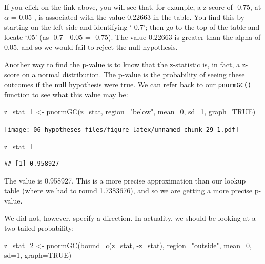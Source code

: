 \documentclass[
]{book}
\newenvironment{Shaded}{\begin{snugshade}}{\end{snugshade}}
\newcommand{\AttributeTok}[1]{\textcolor[rgb]{0.77,0.63,0.00}{#1}}
\newcommand{\ConstantTok}[1]{\textcolor[rgb]{0.00,0.00,0.00}{#1}}
\newcommand{\DecValTok}[1]{\textcolor[rgb]{0.00,0.00,0.81}{#1}}
\newcommand{\FunctionTok}[1]{\textcolor[rgb]{0.00,0.00,0.00}{#1}}
\newcommand{\NormalTok}[1]{#1}
\newcommand{\OtherTok}[1]{\textcolor[rgb]{0.56,0.35,0.01}{#1}}
\newcommand{\SpecialCharTok}[1]{\textcolor[rgb]{0.00,0.00,0.00}{#1}}
\newcommand{\StringTok}[1]{\textcolor[rgb]{0.31,0.60,0.02}{#1}}
\begin{document}
If you click on the link above, you will see that, for example, a z-score of -0.75, at \(\alpha\) = 0.05 , is associated with the value 0.22663 in the table. You find this by starting on the left side and identifying `-0.7'; then go to the top of the table and locate `.05' (as -0.7 - 0.05 = -0.75). The value 0.22663 is greater than the alpha of 0.05, and so we would fail to reject the null hypothesis.

Another way to find the p-value is to know that the z-statistic is, in fact, a z-score on a normal distribution. The p-value is the probability of seeing these outcomes if the null hypothesis were true. We can refer back to our \texttt{pnormGC()} function to see what this value may be:

\begin{Shaded}
\begin{Highlighting}[]
\NormalTok{z\_stat\_1 }\OtherTok{\textless{}{-}} \FunctionTok{pnormGC}\NormalTok{(z\_stat, }\AttributeTok{region=}\StringTok{"below"}\NormalTok{, }\AttributeTok{mean=}\DecValTok{0}\NormalTok{, }\AttributeTok{sd=}\DecValTok{1}\NormalTok{, }\AttributeTok{graph=}\ConstantTok{TRUE}\NormalTok{) }
\end{Highlighting}
\end{Shaded}

\texttt{[image: 06-hypotheses\_files/figure-latex/unnamed-chunk-29-1.pdf]}

\begin{Shaded}
\begin{Highlighting}[]
\NormalTok{z\_stat\_1}
\end{Highlighting}
\end{Shaded}

\begin{verbatim}
## [1] 0.958927
\end{verbatim}

The value is 0.958927. This is a more precise approximation than our lookup table (where we had to round 1.7383676), and so we are getting a more precise p-value.

We did not, however, specify a direction. In actuality, we should be looking at a two-tailed probability:

\begin{Shaded}
\begin{Highlighting}[]
\NormalTok{z\_stat\_2 }\OtherTok{\textless{}{-}} \FunctionTok{pnormGC}\NormalTok{(}\AttributeTok{bound=}\FunctionTok{c}\NormalTok{(z\_stat, }\SpecialCharTok{{-}}\NormalTok{z\_stat), }\AttributeTok{region=}\StringTok{"outside"}\NormalTok{, }\AttributeTok{mean=}\DecValTok{0}\NormalTok{, }\AttributeTok{sd=}\DecValTok{1}\NormalTok{, }\AttributeTok{graph=}\ConstantTok{TRUE}\NormalTok{) }
\end{Highlighting}
\end{Shaded}
\end{document}
